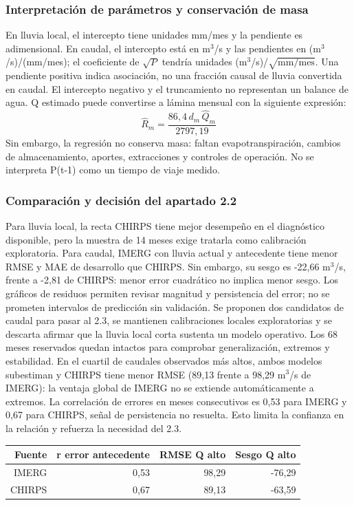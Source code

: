 \documentclass[10pt,a4paper]{article}
\begin{document}
\subsubsection*{Interpretación de parámetros y conservación de masa}
En lluvia local, el intercepto tiene unidades mm/mes y la pendiente es adimensional. En caudal, el intercepto está en m$^3$/s y las pendientes en (m$^3$/s)/(mm/mes); el coeficiente de $\sqrt{P}$ tendría unidades (m$^3$/s)/$\sqrt{\mathrm{mm/mes}}$. Una pendiente positiva indica asociación, no una fracción causal de lluvia convertida en caudal. El intercepto negativo y el truncamiento no representan un balance de agua. Q estimado puede convertirse a lámina mensual con la siguiente expresión:
\begin{equation}
\widehat{R}_m=\frac{86{,}4\,d_m\,\widehat{Q}_m}{2797{,}19}
\end{equation}
Sin embargo, la regresión no conserva masa: faltan evapotranspiración, cambios de almacenamiento, aportes, extracciones y controles de operación. No se interpreta P(t-1) como un tiempo de viaje medido.
\subsubsection*{Comparación y decisión del apartado 2.2}
Para lluvia local, la recta CHIRPS tiene mejor desempeño en el diagnóstico disponible, pero la muestra de 14 meses exige tratarla como calibración exploratoria. Para caudal, IMERG con lluvia actual y antecedente tiene menor RMSE y MAE de desarrollo que CHIRPS. Sin embargo, su sesgo es -22,66 m$^3$/s, frente a -2,81 de CHIRPS: menor error cuadrático no implica menor sesgo. Los gráficos de residuos permiten revisar magnitud y persistencia del error; no se prometen intervalos de predicción sin validación. Se proponen dos candidatos de caudal para pasar al 2.3, se mantienen calibraciones locales exploratorias y se descarta afirmar que la lluvia local corta sustenta un modelo operativo. Los 68 meses reservados quedan intactos para comprobar generalización, extremos y estabilidad. En el cuartil de caudales observados más altos, ambos modelos subestiman y CHIRPS tiene menor RMSE (89,13 frente a 98,29 m$^3$/s de IMERG): la ventaja global de IMERG no se extiende automáticamente a extremos. La correlación de errores en meses consecutivos es 0,53 para IMERG y 0,67 para CHIRPS, señal de persistencia no resuelta. Esto limita la confianza en la relación y refuerza la necesidad del 2.3.
\begin{center}\small\begin{tabular}{rrrr}\hline
Fuente & r error antecedente & RMSE Q alto & Sesgo Q alto \\ \hline
IMERG & 0,53 & 98,29 & -76,29 \\
CHIRPS & 0,67 & 89,13 & -63,59 \\
\hline\end{tabular}\end{center}
\end{document}
